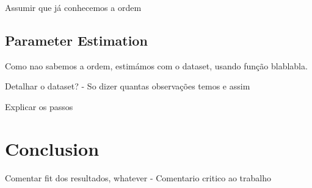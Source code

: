 \documentclass[12pt]{article}
\begin{document}
Assumir que já conhecemos a ordem

\subsection{Parameter Estimation}


Como nao sabemos a ordem, estimámos com o dataset, usando função blablabla.

Detalhar o dataset? - So dizer quantas observações temos e assim

Explicar os passos

\section{Conclusion}
\label{conclusion}

Comentar fit dos resultados, whatever - Comentario critico ao trabalho
\end{document}
